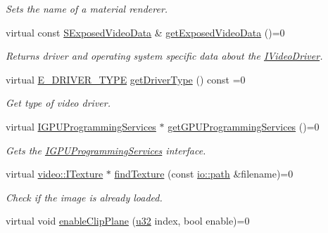 \begin{DoxyCompactItemize}
\begin{DoxyCompactList}\small\item\em Sets the name of a material renderer. \end{DoxyCompactList}\item 
virtual const \hyperlink{structirr_1_1video_1_1SExposedVideoData}{S\+Exposed\+Video\+Data} \& \hyperlink{classirr_1_1video_1_1IVideoDriver_a4f3535b2125e654e2e9645745e50cc49}{get\+Exposed\+Video\+Data} ()=0
\begin{DoxyCompactList}\small\item\em Returns driver and operating system specific data about the \hyperlink{classirr_1_1video_1_1IVideoDriver}{I\+Video\+Driver}. \end{DoxyCompactList}\item 
virtual \hyperlink{namespaceirr_1_1video_ae35a6de6d436c76107ad157fe42356d0}{E\+\_\+\+D\+R\+I\+V\+E\+R\+\_\+\+T\+Y\+PE} \hyperlink{classirr_1_1video_1_1IVideoDriver_ade555878f685d40aba348a71f25cd73c}{get\+Driver\+Type} () const  =0
\begin{DoxyCompactList}\small\item\em Get type of video driver. \end{DoxyCompactList}\item 
virtual \hyperlink{classirr_1_1video_1_1IGPUProgrammingServices}{I\+G\+P\+U\+Programming\+Services} $\ast$ \hyperlink{classirr_1_1video_1_1IVideoDriver_ad2098a408bbe9dad8053c3f4aea7d856}{get\+G\+P\+U\+Programming\+Services} ()=0
\begin{DoxyCompactList}\small\item\em Gets the \hyperlink{classirr_1_1video_1_1IGPUProgrammingServices}{I\+G\+P\+U\+Programming\+Services} interface. \end{DoxyCompactList}\item 
virtual \hyperlink{classirr_1_1video_1_1ITexture}{video\+::\+I\+Texture} $\ast$ \hyperlink{classirr_1_1video_1_1IVideoDriver_ad4eaed6d56b092e6805400ca59795de9}{find\+Texture} (const \hyperlink{namespaceirr_1_1io_ab1bdc45edb3f94d8319c02bc0f840ee1}{io\+::path} \&filename)=0
\begin{DoxyCompactList}\small\item\em Check if the image is already loaded. \end{DoxyCompactList}\item 
virtual void \hyperlink{classirr_1_1video_1_1IVideoDriver_aaaf9567c759f866311c76e3874822339}{enable\+Clip\+Plane} (\hyperlink{namespaceirr_a0416a53257075833e7002efd0a18e804}{u32} index, bool enable)=0

\end{DoxyCompactItemize}
